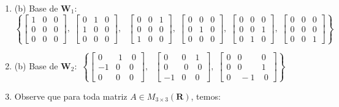 \documentclass{report}
\begin{document}
\begin{enumerate}
\item  (b) Base de $\mathbf{W}_{1}:$\newline
$\left\{ \left[
\begin{array}{rrr}
1 & 0 & 0 \\
0 & 0 & 0 \\
0 & 0 & 0
\end{array}
\right] ,\;\left[
\begin{array}{lll}
0 & 1 & 0 \\
1 & 0 & 0 \\
0 & 0 & 0
\end{array}
\right] ,\text{\ }\left[
\begin{array}{lll}
0 & 0 & 1 \\
0 & 0 & 0 \\
1 & 0 & 0
\end{array}
\right] ,\;\left[
\begin{array}{lll}
0 & 0 & 0 \\
0 & 1 & 0 \\
0 & 0 & 0
\end{array}
\right] ,\;\left[
\begin{array}{lll}
0 & 0 & 0 \\
0 & 0 & 1 \\
0 & 1 & 0
\end{array}
\right] ,\;\left[
\begin{array}{lll}
0 & 0 & 0 \\
0 & 0 & 0 \\
0 & 0 & 1
\end{array}
\right] \right\} $

\item  (b) Base de $\mathbf{W}_{2}:$ $\left\{ \left[
\begin{array}{rrr}
0 & \;1 & \;0 \\
-1 & 0 & 0 \\
0 & 0 & 0
\end{array}
\right] ,\text{\ }\left[
\begin{array}{rrr}
0 & 0 & 1 \\
0 & \;0 & \;0 \\
-1 & 0 & 0
\end{array}
\right] ,\;\left[
\begin{array}{rrr}
0 & 0 & 0 \\
0 & 0 & 1 \\
0 & \;-1 & \;0
\end{array}
\right] \right\} $

\item  Observe que para toda matriz $A\in M_{3\times 3}(\mathbf{R})$, temos:


\end{enumerate}
\end{document}
